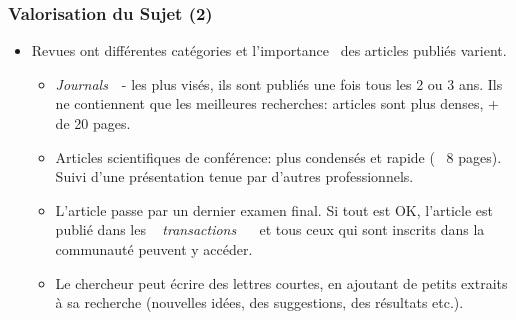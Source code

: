 \documentclass[10pt]{beamer}
\begin{document}
\begin{frame}
\frametitle{Valorisation du Sujet (2)}

\begin{itemize}

\item  Revues ont différentes catégories et \og l'importance \fg~des articles publiés varient.

\begin{itemize}
  	\item \og\textit{Journals}~\fg~- les plus visés, ils sont publiés une fois
  	tous les 2 ou 3 ans. Ils ne contiennent que les meilleures recherches:
  	articles sont plus denses, + de 20 pages. 
	\vspace{8pt}
	\item Articles scientifiques de conférence: plus condensés et
	rapide (~ 8 pages). Suivi d'une présentation tenue par d'autres
	professionnels. 
	\vspace{8pt}
	\item L'article passe par un dernier examen final. Si tout est OK,
l'article est publié dans les \og~ \textit{transactions} ~\fg~ et tous ceux qui
sont inscrits dans la communauté peuvent y accéder. 
	\vspace{8pt}
	\item Le chercheur peut écrire des lettres courtes, en ajoutant de petits
	extraits à sa recherche (nouvelles idées, des suggestions, des résultats etc.).

\end{itemize}

\end{itemize}
\end{frame}
\end{document}
